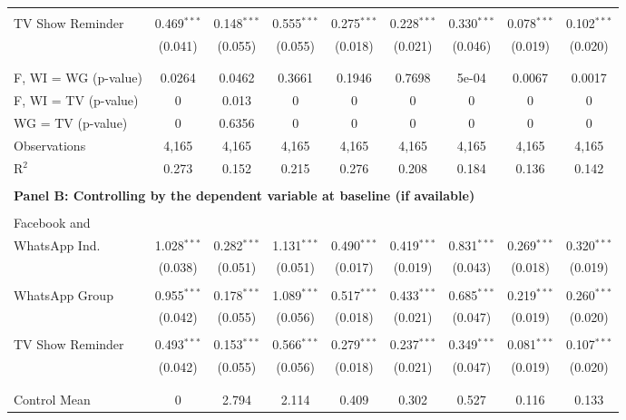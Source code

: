 \documentclass[12pt]{article}
\begin{document}
\begin{table}[H]
\begin{tabular}{@{\extracolsep{2pt}}lcccccccc}
  & & & & & & & & \\ 
 TV Show Reminder & 0.469$^{***}$ & 0.148$^{***}$ & 0.555$^{***}$ & 0.275$^{***}$ & 0.228$^{***}$ & 0.330$^{***}$ & 0.078$^{***}$ & 0.102$^{***}$ \\ 
  & (0.041) & (0.055) & (0.055) & (0.018) & (0.021) & (0.046) & (0.019) & (0.020) \\ 
  & & & & & & & & \\ 
\hline \\[-1.8ex] 
F, WI = WG (p-value) & 0.0264 & 0.0462 & 0.3661 & 0.1946 & 0.7698 & 5e-04 & 0.0067 & 0.0017 \\ 
F, WI = TV (p-value) & 0 & 0.013 & 0 & 0 & 0 & 0 & 0 & 0 \\ 
WG = TV (p-value) & 0 & 0.6356 & 0 & 0 & 0 & 0 & 0 & 0 \\ 
Observations & 4,165 & 4,165 & 4,165 & 4,165 & 4,165 & 4,165 & 4,165 & 4,165 \\ 
R$^{2}$ & 0.273 & 0.152 & 0.215 & 0.276 & 0.208 & 0.184 & 0.136 & 0.142 \\ 
\hline 
\\[-0.5ex] 
\multicolumn{9}{l}{\textbf{Panel B: Controlling by the dependent variable at baseline (if available)}} \\
\hline \\[-1ex]  
 Facebook and \\ WhatsApp Ind. & 1.028$^{***}$ & 0.282$^{***}$ & 1.131$^{***}$ & 0.490$^{***}$ & 0.419$^{***}$ & 0.831$^{***}$ & 0.269$^{***}$ & 0.320$^{***}$ \\ 
  & (0.038) & (0.051) & (0.051) & (0.017) & (0.019) & (0.043) & (0.018) & (0.019) \\ 
  & & & & & & & & \\ 
 WhatsApp Group & 0.955$^{***}$ & 0.178$^{***}$ & 1.089$^{***}$ & 0.517$^{***}$ & 0.433$^{***}$ & 0.685$^{***}$ & 0.219$^{***}$ & 0.260$^{***}$ \\ 
  & (0.042) & (0.055) & (0.056) & (0.018) & (0.021) & (0.047) & (0.019) & (0.020) \\ 
  & & & & & & & & \\ 
 TV Show Reminder & 0.493$^{***}$ & 0.153$^{***}$ & 0.566$^{***}$ & 0.279$^{***}$ & 0.237$^{***}$ & 0.349$^{***}$ & 0.081$^{***}$ & 0.107$^{***}$ \\ 
  & (0.042) & (0.055) & (0.056) & (0.018) & (0.021) & (0.047) & (0.019) & (0.020) \\ 
  & & & & & & & & \\ 
\hline \\[-1.8ex] 
Control Mean & 0 & 2.794 & 2.114 & 0.409 & 0.302 & 0.527 & 0.116 & 0.133 \\ 

\end{tabular}
\end{table}
\end{document}
